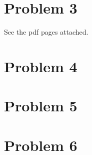 \documentclass{scrartcl}
\begin{document}
\section{Problem 3}
See the pdf pages attached.

\section{Problem 4}
\section{Problem 5}
\section{Problem 6}


\end{document}
